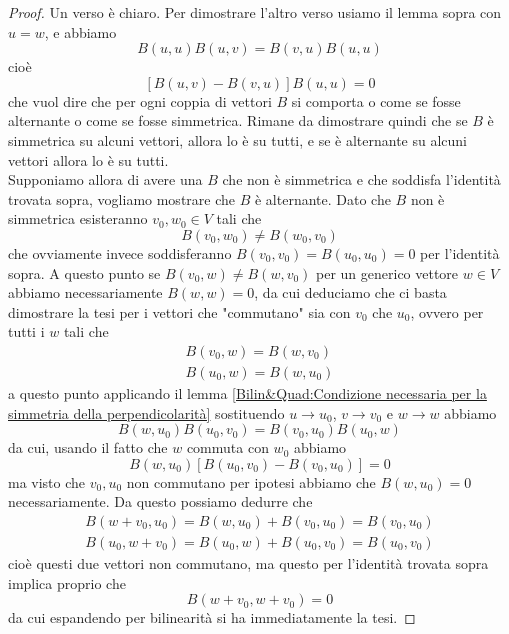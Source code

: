 \documentclass[11pt]{scrartcl}
\begin{document}
	\begin{proof}
		Un verso è chiaro. Per dimostrare l'altro verso 
		usiamo il lemma sopra con $u=w$, e abbiamo
		$$B(u,u)B(u,v)=B(v,u)B(u,u)$$
		cioè
		$$\left[B(u,v)-B(v,u)\right]B(u,u)=0$$
		che vuol dire che per ogni coppia di vettori $B$ si comporta o come se fosse alternante o come se fosse simmetrica. Rimane da dimostrare quindi che se $B$ è simmetrica su alcuni vettori, allora lo è su tutti, e se è alternante su alcuni vettori allora lo è su tutti. \\
		Supponiamo allora di avere una $B$ che non è simmetrica e che soddisfa l'identità trovata sopra, vogliamo mostrare che $B$ è alternante. Dato che $B$ non è simmetrica esisteranno $v_0,w_0\in V$ tali che
		$$B(v_0,w_0)\ne B(w_0,v_0)$$
		che ovviamente invece soddisferanno $B(v_0,v_0)=B(u_0,u_0)=0$ per l'identità sopra. A questo punto se $B(v_0,w)\ne B(w,v_0)$ per un generico vettore $w\in V$ abbiamo necessariamente $B(w,w)=0$, da cui deduciamo che ci basta dimostrare la tesi per i vettori che "commutano" sia con $v_0$ che $u_0$, ovvero per tutti i $w$ tali che
		\begin{gather*}
			B(v_0,w)=B(w,v_0) \\
			B(u_0,w)=B(w,u_0)
		\end{gather*}
		a questo punto applicando il lemma \ref{Bilin&Quad:Condizione necessaria per la simmetria della perpendicolarità} sostituendo $u\to u_0$, $v\to v_0$ e $w\to w$ abbiamo
		$$B(w,u_0)B(u_0,v_0)=B(v_0,u_0)B(u_0,w)$$
		da cui, usando il fatto che $w$ commuta con $w_0$ abbiamo
		$$B(w,u_0)\left[B(u_0,v_0)-B(v_0,u_0)\right]=0$$
		ma visto che $v_0,u_0$ non commutano per ipotesi abbiamo che $B(w,u_0)=0$ necessariamente. Da questo possiamo dedurre che
		\begin{gather*}
			B(w+v_0,u_0)=B(w,u_0)+B(v_0,u_0) = B(v_0,u_0)\\
			B(u_0,w+v_0)=B(u_0,w)+B(u_0,v_0) = B(u_0,v_0)
		\end{gather*}
		cioè questi due vettori non commutano, ma questo per l'identità trovata sopra implica proprio che
		$$B(w+v_0,w+v_0)=0$$
		da cui espandendo per bilinearità si ha immediatamente la tesi.
	\end{proof}
	
\end{document}
